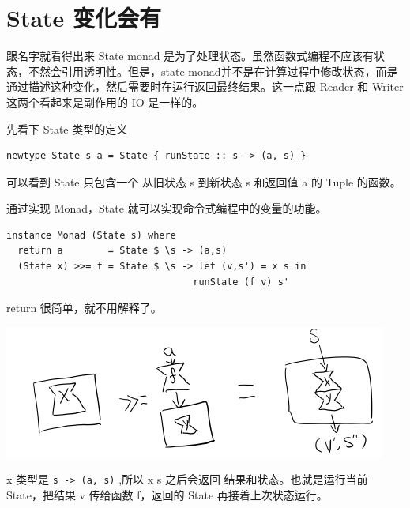 \documentclass[11pt]{tufte-book}
\begin{document}
\chapter{State 变化会有}
\label{sec:orgf83aa9d}
跟名字就看得出来 State monad 是为了处理状态。虽然函数式编程不应该有状态，不然会引用透明性。但是，state monad并不是在计算过程中修改状态，而是通过描述这种变化，然后需要时在运行返回最终结果。这一点跟 Reader 和 Writer 这两个看起来是副作用的 IO 是一样的。

先看下 State 类型的定义
\begin{verbatim}
newtype State s a = State { runState :: s -> (a, s) }
\end{verbatim}

可以看到 State 只包含一个 从旧状态 s 到新状态 s 和返回值 a 的 Tuple 的函数。

通过实现 Monad，State 就可以实现命令式编程中的变量的功能。
\begin{verbatim}
instance Monad (State s) where
  return a        = State $ \s -> (a,s)
  (State x) >>= f = State $ \s -> let (v,s') = x s in
                                 runState (f v) s'
\end{verbatim}
return 很简单，就不用解释了。

\begin{center}
\includegraphics[width=.9\linewidth]{images/p2-state-monad.png}
\end{center}

x 类型是 \texttt{s -> (a, s)} ,所以 x s 之后会返回 结果和状态。也就是运行当前 State，把结果 v 传给函数 f，返回的 State 再接着上次状态运行。
\end{document}
